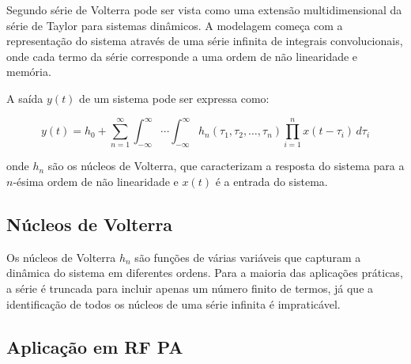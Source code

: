 Segundo \cite{Gonçalves2009} série de Volterra pode ser vista como uma extensão multidimensional da série de Taylor para sistemas dinâmicos. A modelagem começa com a representação do sistema através de uma série infinita de integrais convolucionais, onde cada termo da série corresponde a uma ordem de não linearidade e memória.

A saída \( y(t) \) de um sistema pode ser expressa como:

\[
y(t) = h_0 + \sum_{n=1}^{\infty} \int_{-\infty}^{\infty} \cdots \int_{-\infty}^{\infty} h_n(\tau_1, \tau_2, \ldots, \tau_n) \prod_{i=1}^{n} x(t - \tau_i) \, d\tau_i
\]

onde \( h_n \) são os núcleos de Volterra, que caracterizam a resposta do sistema para a \( n \)-ésima ordem de não linearidade e \( x(t) \) é a entrada do sistema.

\subsection*{Núcleos de Volterra}

Os núcleos de Volterra \( h_n \) são funções de várias variáveis que capturam a dinâmica do sistema em diferentes ordens. Para a maioria das aplicações práticas, a série é truncada para incluir apenas um número finito de termos, já que a identificação de todos os núcleos de uma série infinita é impraticável.

\subsection*{Aplicação em RF PA}

